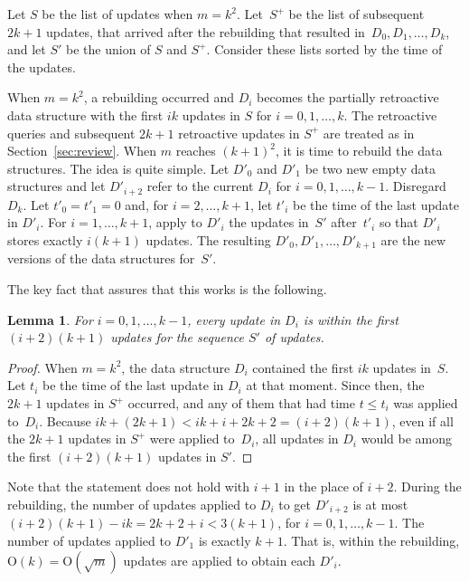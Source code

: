 \documentclass[3p,times,procedia]{elsarticle}
\newcommand{\Oh}{\mathrm{O}}
\newtheorem{lemma}     	[theorem] {Lemma}
\begin{document}
Let $S$ be the list of updates when $m=k^2$. 
Let~$S^+$ be the list of subsequent $2k+1$ updates, 
that arrived after the rebuilding that resulted in~$D_0,D_1,\ldots,D_k$,
and let $S'$ be the union of $S$ and $S^+$.  
Consider these lists sorted by the time of the updates. 

When $m=k^2$, a rebuilding occurred and $D_i$ becomes the partially retroactive 
data structure with the first $ik$ updates in $S$ for $i=0,1,\ldots,k$. 
The retroactive queries and subsequent $2k+1$ retroactive updates in $S^+$ 
are treated as in Section~\ref{sec:review}. 
When $m$ reaches $(k+1)^2$, it is time to rebuild the data structures.  
The idea is quite simple.  Let $D'_0$ and $D'_1$ be two new empty data structures 
and let $D'_{i+2}$ refer to the current $D_i$ for $i=0,1,\ldots,k-1$.  Disregard $D_k$.   
Let $t'_0 = t'_1 = 0$ and, for $i=2,\ldots,k+1$, 
let $t'_i$ be the time of the last update in $D'_i$.
For $i=1,\ldots,k+1$, apply to $D'_i$ the updates in~$S'$ 
after~$t'_i$ so that $D'_i$ stores exactly $i(k+1)$ updates.
The resulting $D'_0,D'_1,\ldots,D'_{k+1}$ are the new versions of the data structures for~$S'$. 

\medskip 

The key fact that assures that this works is the following. 

\begin{lemma}
  For $i=0,1,\ldots,k-1$, every update in $D_i$ is within 
  the first $(i+2)(k+1)$ updates for the sequence $S'$ of updates. 
\end{lemma}

\begin{proof}
  When $m=k^2$, the data structure $D_i$ contained the first $ik$ updates in~$S$. 
  Let $t_i$ be the time of the last update in $D_i$ at that moment.
  Since then, the $2k+1$ updates in $S^+$ occurred, 
  and any of them that had time $t \leq t_i$ was applied to~$D_i$. 
  Because $ik+(2k+1) < ik+i+2k+2 = (i+2)(k+1)$, 
  even if all the $2k+1$ updates in $S^+$ were applied to~$D_i$,
  all updates in $D_i$ would be among the first $(i+2)(k+1)$ updates in $S'$. 
\end{proof}

Note that the statement does not hold with $i+1$ in the place of $i+2$. 
During the rebuilding, the number of updates applied to $D_i$ to get $D'_{i+2}$ 
is at most $(i+2)(k+1)-ik = 2k+2+i < 3(k+1)$, for $i=0,1,\ldots,k-1$.  
The number of updates applied to $D'_1$ is exactly $k+1$.  That is, within the 
rebuilding, $\Oh(k) = \Oh(\sqrt{m})$ updates are applied to obtain each $D'_i$.
\end{document}
